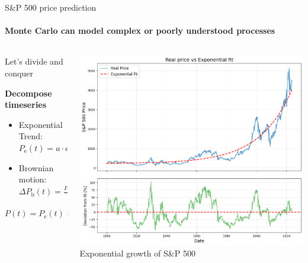 \documentclass{beamer}
\begin{document}
\begin{frame}{S\&P 500 price prediction}
  \framesubtitle{Monte Carlo can model complex or poorly understood processes}
  \begin{columns}[c]
    \begin{column}{0.4\textwidth}
      Let's divide and conquer
      \vspace{0.5cm}

      \textbf{Decompose timeseries}
      \begin{itemize}
        \item Exponential Trend: $P_{\text{e}}(t) = a \cdot e^{bt} + c$
        \item Brownian motion: $\Delta P_{\text{b}}(t) = \frac{P(t) - P_{\text{e}}(t)}{P_{\text{e}}(t)}$
      \end{itemize}

      \vspace{0.6cm}
      $P(t) = P_{\text{e}}(t) \times (1 + \Delta P_{\text{b}}(t))$
    \end{column}
    \begin{column}{0.5\textwidth}
      \begin{center}
        \includegraphics[width=\textwidth]{images/snp500-fit.png}
        \\[0.2cm]
        \small{Exponential growth of S\&P 500}
      \end{center}
    \end{column}
  \end{columns}
\end{frame}
\end{document}
